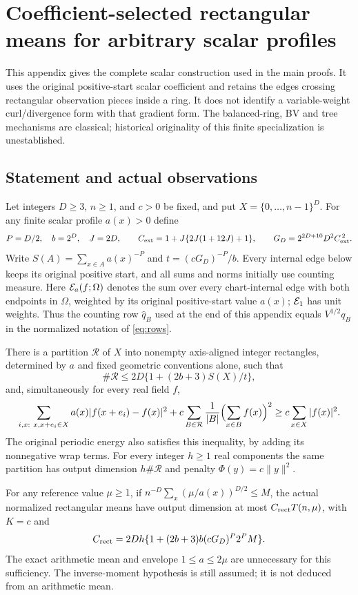 \section{Coefficient-selected rectangular means for arbitrary scalar profiles}
\label{sec:balanced223}
This appendix gives the complete scalar construction used in the main proofs.
It uses the original positive-start scalar coefficient and
retains the edges crossing rectangular observation pieces inside a ring.
It does not identify a variable-weight curl/divergence form with that gradient
form. The balanced-ring, BV and tree mechanisms are classical;
historical originality of this finite specialization is unestablished.

\subsection{Statement and actual observations}
Let integers $D\ge3$, $n\ge1$, and $c>0$ be fixed, and put
$X=\{0,\ldots,n-1\}^D$. For any finite scalar profile $a(x)>0$ define
\[
 P=D/2,\quad b=2^D,\quad J=2D,\qquad
 C_{\rm ext}=1+J\{2J(1+12J)+1\},\qquad
 G_D=2^{2D+10}D^2C_{\rm ext}^{\,2}.
\]
Write $S(A)=\sum_{x\in A}a(x)^{-P}$ and
$t=(cG_D)^{-P}/b$. Every internal edge below keeps its original positive
start, and all sums and norms initially use counting measure. Here $\mathcal E_a(f;\Omega)$
denotes the sum over every chart-internal edge with both endpoints in $\Omega$,
weighted by its original positive-start value $a(x)$; $\mathcal E_1$ has unit weights.
Thus the counting row $\widehat q_B$ used at the end of this appendix equals
$V^{1/2}q_B$ in the normalized notation of \eqref{eq:rows}.
\begin{theorem}\label{thm:balanced223}
There is a partition $\mathcal R$ of $X$ into nonempty axis-aligned integer
rectangles, determined by $a$ and fixed geometric conventions alone, such that
\[
 \#\mathcal R\le2D\{1+(2b+3)S(X)/t\},
\]
and, simultaneously for every real field $f$,
\begin{equation}\label{eq:balanced223-final}
 \sum_{i,x:\ x,x+e_i\in X}a(x)|f(x+e_i)-f(x)|^2
 +c\sum_{B\in\mathcal R}\frac1{|B|}\Bigl(\sum_{x\in B}f(x)\Bigr)^2
 \ge c\sum_{x\in X}|f(x)|^2.
\end{equation}
The original periodic energy also satisfies this inequality, by adding
its nonnegative wrap terms. For every integer $h\ge1$ real components the same
partition has output dimension $h\#\mathcal R$ and penalty $\Phi(y)=c\|y\|^2$.
\end{theorem}
\begin{corollary}\label{cor:balanced223-moment}
For any reference value $\mu\ge1$, if
$n^{-D}\sum_x(\mu/a(x))^{D/2}\le M$, the actual normalized rectangular
means have output dimension at most $C_{\rm rect}T(n,\mu)$, with $K=c$ and
\[
 C_{\rm rect}=2Dh\{1+(2b+3)b(cG_D)^P2^PM\}.
\]
The exact arithmetic mean and envelope $1\le a\le2\mu$ are unnecessary
for this sufficiency. The inverse-moment hypothesis is still assumed;
it is not deduced from an arithmetic mean.
\end{corollary}
